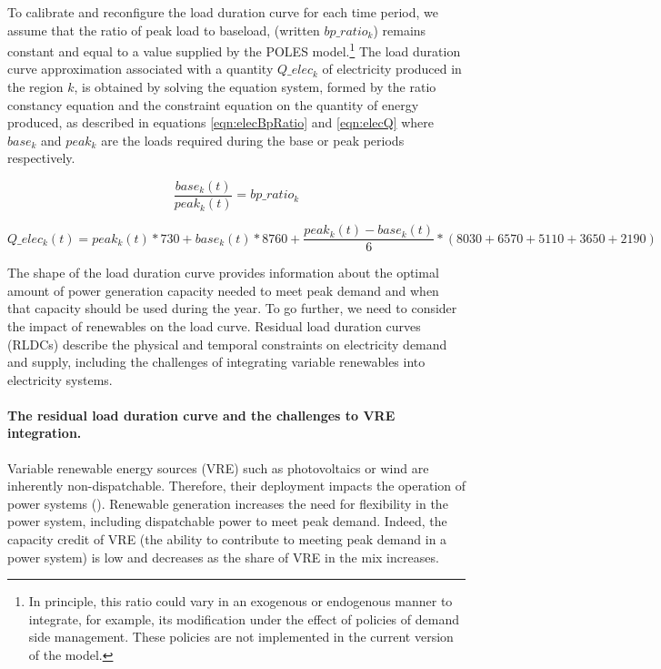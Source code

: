 To calibrate and reconfigure the load duration curve for each time period, we assume that the ratio of peak load to baseload, (written $bp\_ratio_k$) remains constant and equal to a value supplied by the POLES model.\footnote{
    In principle, this ratio could vary in an exogenous or endogenous manner to integrate, for example, its modification under the effect of policies of demand side management. These policies are not implemented in the current version of the model.
}
The load duration curve approximation associated with a quantity $Q\_elec_k$ of electricity produced in the region $k$, is obtained by solving the equation system, formed by the ratio constancy equation and the constraint equation on the quantity of energy produced, as described in equations \ref{eqn:elecBpRatio} and  \ref{eqn:elecQ}
where $base_k$ and $peak_k$ are the loads required during the base or peak periods respectively.

\begin{dmath}
    \frac{base_k(t)}{peak_k(t)} = bp\_ratio_k
    \label{eqn:elecBpRatio}
\end{dmath}

\begin{dmath}
    Q\_elec_k(t) =
    peak_k(t) * 730 +
    base_k(t) * 8760 + \frac{peak_k(t) - base_k(t)}{6} * ( 8030 + 6570 + 5110 + 3650 + 2190)
    \label{eqn:elecQ}
\end{dmath}

The shape of the load duration curve provides information about the optimal amount of power generation capacity needed to meet peak demand and when that capacity should be used during the year. To go further, we need to consider the impact of renewables on the load curve. Residual load duration curves (RLDCs) describe the physical and temporal constraints on electricity demand and supply, including the challenges of integrating variable renewables into electricity systems.

\paragraph{The residual load duration curve and the challenges to VRE integration.}

Variable renewable energy sources (VRE) such as photovoltaics or wind are inherently non-dispatchable. Therefore, their deployment impacts the operation of power systems (\cite{Hirth2015}). Renewable generation increases the need for flexibility in the power system, including dispatchable power to meet peak demand. Indeed, the capacity credit of VRE (the ability to contribute to meeting peak demand in a power system) is low and decreases as the share of VRE in the mix increases.

